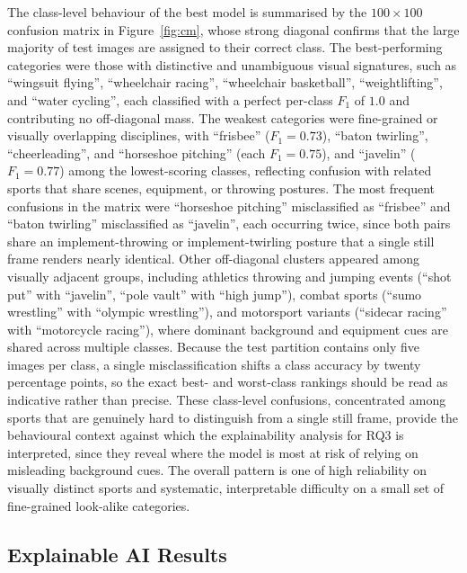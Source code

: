 The class-level behaviour of the best model is summarised by the $100\times100$ confusion matrix in Figure~\ref{fig:cm}, whose strong diagonal confirms that the large majority of test images are assigned to their correct class.
The best-performing categories were those with distinctive and unambiguous visual signatures, such as ``wingsuit flying'', ``wheelchair racing'', ``wheelchair basketball'', ``weightlifting'', and ``water cycling'', each classified with a perfect per-class $F_1$ of $1.0$ and contributing no off-diagonal mass.
The weakest categories were fine-grained or visually overlapping disciplines, with ``frisbee'' ($F_1=0.73$), ``baton twirling'', ``cheerleading'', and ``horseshoe pitching'' (each $F_1=0.75$), and ``javelin'' ($F_1=0.77$) among the lowest-scoring classes, reflecting confusion with related sports that share scenes, equipment, or throwing postures.
The most frequent confusions in the matrix were ``horseshoe pitching'' misclassified as ``frisbee'' and ``baton twirling'' misclassified as ``javelin'', each occurring twice, since both pairs share an implement-throwing or implement-twirling posture that a single still frame renders nearly identical.
Other off-diagonal clusters appeared among visually adjacent groups, including athletics throwing and jumping events (``shot put'' with ``javelin'', ``pole vault'' with ``high jump''), combat sports (``sumo wrestling'' with ``olympic wrestling''), and motorsport variants (``sidecar racing'' with ``motorcycle racing''), where dominant background and equipment cues are shared across multiple classes.
Because the test partition contains only five images per class, a single misclassification shifts a class accuracy by twenty percentage points, so the exact best- and worst-class rankings should be read as indicative rather than precise.
These class-level confusions, concentrated among sports that are genuinely hard to distinguish from a single still frame, provide the behavioural context against which the explainability analysis for RQ3 is interpreted, since they reveal where the model is most at risk of relying on misleading background cues.
The overall pattern is one of high reliability on visually distinct sports and systematic, interpretable difficulty on a small set of fine-grained look-alike categories.

\subsection{Explainable AI Results}
\label{subsec:res-xai}

